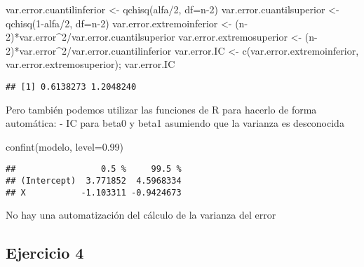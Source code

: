 \documentclass[
]{article}
\newenvironment{Shaded}{\begin{snugshade}}{\end{snugshade}}
\newcommand{\AttributeTok}[1]{\textcolor[rgb]{0.77,0.63,0.00}{#1}}
\newcommand{\DecValTok}[1]{\textcolor[rgb]{0.00,0.00,0.81}{#1}}
\newcommand{\FloatTok}[1]{\textcolor[rgb]{0.00,0.00,0.81}{#1}}
\newcommand{\FunctionTok}[1]{\textcolor[rgb]{0.00,0.00,0.00}{#1}}
\newcommand{\NormalTok}[1]{#1}
\newcommand{\OtherTok}[1]{\textcolor[rgb]{0.56,0.35,0.01}{#1}}
\newcommand{\SpecialCharTok}[1]{\textcolor[rgb]{0.00,0.00,0.00}{#1}}
\begin{document}
\begin{Shaded}
\begin{Highlighting}[]
\NormalTok{var.error.cuantilinferior }\OtherTok{\textless{}{-}} \FunctionTok{qchisq}\NormalTok{(alfa}\SpecialCharTok{/}\DecValTok{2}\NormalTok{, }\AttributeTok{df=}\NormalTok{n}\DecValTok{{-}2}\NormalTok{)}
\NormalTok{var.error.cuantilsuperior }\OtherTok{\textless{}{-}} \FunctionTok{qchisq}\NormalTok{(}\DecValTok{1}\SpecialCharTok{{-}}\NormalTok{alfa}\SpecialCharTok{/}\DecValTok{2}\NormalTok{, }\AttributeTok{df=}\NormalTok{n}\DecValTok{{-}2}\NormalTok{)}
\NormalTok{var.error.extremoinferior }\OtherTok{\textless{}{-}}\NormalTok{ (n}\DecValTok{{-}2}\NormalTok{)}\SpecialCharTok{*}\NormalTok{var.error}\SpecialCharTok{\^{}}\DecValTok{2}\SpecialCharTok{/}\NormalTok{var.error.cuantilsuperior}
\NormalTok{var.error.extremosuperior }\OtherTok{\textless{}{-}}\NormalTok{ (n}\DecValTok{{-}2}\NormalTok{)}\SpecialCharTok{*}\NormalTok{var.error}\SpecialCharTok{\^{}}\DecValTok{2}\SpecialCharTok{/}\NormalTok{var.error.cuantilinferior}
\NormalTok{var.error.IC }\OtherTok{\textless{}{-}} \FunctionTok{c}\NormalTok{(var.error.extremoinferior, var.error.extremosuperior); var.error.IC}
\end{Highlighting}
\end{Shaded}

\begin{verbatim}
## [1] 0.6138273 1.2048240
\end{verbatim}

Pero también podemos utilizar las funciones de R para hacerlo de forma
automática: - IC para beta0 y beta1 asumiendo que la varianza es
desconocida

\begin{Shaded}
\begin{Highlighting}[]
\FunctionTok{confint}\NormalTok{(modelo, }\AttributeTok{level=}\FloatTok{0.99}\NormalTok{)}
\end{Highlighting}
\end{Shaded}

\begin{verbatim}
##                 0.5 %     99.5 %
## (Intercept)  3.771852  4.5968334
## X           -1.103311 -0.9424673
\end{verbatim}

No hay una automatización del cálculo de la varianza del error

\hypertarget{ejercicio-4}{%
\subsection{Ejercicio 4}\label{ejercicio-4}}
\end{document}
